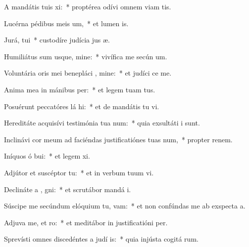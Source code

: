 \item A mandátis tuis xi:~* proptérea odívi omnem viam tis.
\item Lucérna pédibus meis  um,~* et lumen  is.
\item Jurá,  tui~* custodíre judícia jus æ.
\item Humiliátus sum usque, mine:~* vivífica me secún  um.
\item Voluntária oris mei benepláci , mine:~* et judíci  ce me.
\item Anima mea in mánibus  per:~* et legem tuam   tus.
\item Posuérunt peccatóres lá hi:~* et de mandátis tu  vi.
\item Hereditáte acquisívi testimónia tua  num:~* quia exsultáti  i sunt.
\item Inclinávi cor meum ad faciéndas justificatiónes tuas  num,~* propter renem.
\item Iníquos ó bui:~* et legem  xi.
\item Adjútor et suscéptor   tu:~* et in verbum tuum vi.
\item Declináte a , gni:~* et scrutábor mandá  i.
\item Súscipe me secúndum elóquium tu,  vam:~* et non confúndas me ab exspecta a.
\item Adjuva me, et  ro:~* et meditábor in justificatióni  per.
\item Sprevísti omnes discedéntes a judí is:~* quia injústa cogitá rum.
